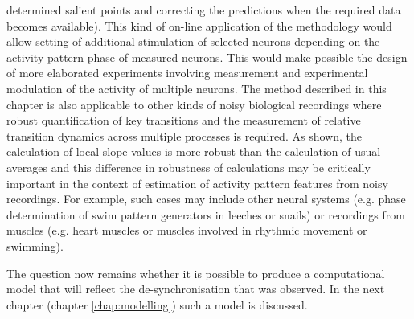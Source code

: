 determined salient points and correcting the predictions when the required data becomes available). This kind of on-line application of the methodology would allow setting of additional stimulation of selected neurons depending on the activity pattern phase of measured neurons. This would make possible the design of more elaborated experiments involving measurement and experimental modulation of
the activity of multiple neurons. The method described in this chapter is also applicable to other kinds of noisy biological recordings where robust quantification of key transitions and the measurement of relative transition dynamics across multiple processes is required.
As shown, the calculation of local slope values is more robust than the
calculation of usual averages and this difference in robustness of calculations may be critically important in the context of estimation of activity pattern features from noisy recordings. For example, such cases may include other neural systems (e.g. phase determination of swim pattern generators in leeches or snails) or recordings from muscles (e.g. heart muscles or muscles involved in rhythmic movement or
swimming).

The question now remains whether it is possible to produce a computational model that will reflect the de-synchronisation that was observed. In the next chapter (chapter \ref{chap:modelling}) such a model is discussed. 
